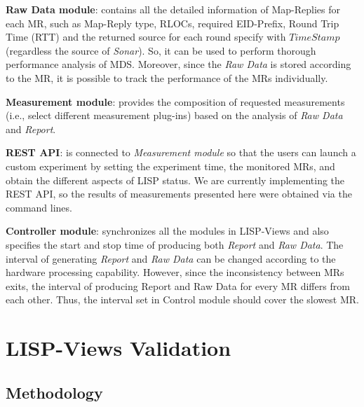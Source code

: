 \textbf{Raw Data module}: contains all the detailed information of Map-Replies for each MR, such as Map-Reply type, RLOCs, required EID-Prefix, Round Trip Time (RTT) and the returned source for each round specify with $Time Stamp$ (regardless the source of \emph{Sonar}).  So, it can be used to perform thorough performance analysis of MDS. Moreover, since the \emph{Raw Data} is stored according to the MR, it is possible to track the performance of the MRs individually.

\textbf{Measurement module}: provides the composition of requested measurements (i.e., select different measurement plug-ins) based on the analysis of \emph{Raw Data} and \emph{Report}.

\textbf{REST API}: is connected to \emph{Measurement module} so that the users can launch a custom experiment by setting the experiment time, the monitored MRs, and obtain the different aspects of LISP status.  We are currently implementing the REST API, so the results of measurements presented here were obtained via the command lines.

\textbf{Controller module}: synchronizes all the modules in LISP-Views and also specifies the start and stop time of producing both \emph{Report} and \emph{Raw Data}. The interval of generating \emph{Report} and \emph{Raw Data} can be changed according to the hardware processing capability. However, since the inconsistency between MRs exits, the interval of producing Report and Raw Data for every MR differs from each other. Thus, the interval set in Control module should cover the slowest MR. 


\section{LISP-Views Validation}
\label{sec:lispviews_evaluation}


\subsection{Methodology}
\label{sec:lispviews_evaluation_meth}

